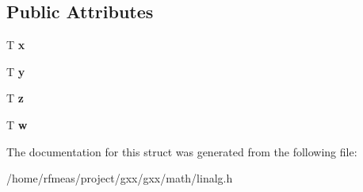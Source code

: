 \subsection*{Public Attributes}
\begin{DoxyCompactItemize}
\item 
T {\bfseries x}\hypertarget{structlinalg_1_1vec_3_01T_00_014_01_4_a8ea77f56892d721c3dd91da3f5929dde}{}\label{structlinalg_1_1vec_3_01T_00_014_01_4_a8ea77f56892d721c3dd91da3f5929dde}

\item 
T {\bfseries y}\hypertarget{structlinalg_1_1vec_3_01T_00_014_01_4_a4ef37cb3c3733e9ced830a5c173ee2ed}{}\label{structlinalg_1_1vec_3_01T_00_014_01_4_a4ef37cb3c3733e9ced830a5c173ee2ed}

\item 
T {\bfseries z}\hypertarget{structlinalg_1_1vec_3_01T_00_014_01_4_a8497b6644e496a346e68d404fe5512e5}{}\label{structlinalg_1_1vec_3_01T_00_014_01_4_a8497b6644e496a346e68d404fe5512e5}

\item 
T {\bfseries w}\hypertarget{structlinalg_1_1vec_3_01T_00_014_01_4_ae52f17412dd29611c842e1a34eac9b92}{}\label{structlinalg_1_1vec_3_01T_00_014_01_4_ae52f17412dd29611c842e1a34eac9b92}

\end{DoxyCompactItemize}


The documentation for this struct was generated from the following file\+:\begin{DoxyCompactItemize}
\item 
/home/rfmeas/project/gxx/gxx/math/linalg.\+h\end{DoxyCompactItemize}
